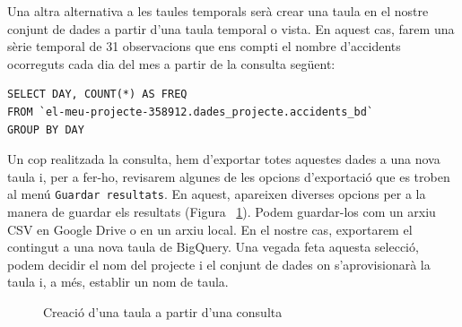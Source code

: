 \documentclass[12pt,longbibliography]{article}
\theoremstyle{definition}
\theoremstyle{remark}
\begin{document}
Una altra alternativa a les taules temporals serà crear una taula en el nostre conjunt de dades a partir d'una taula temporal o vista. En aquest cas, farem una sèrie temporal de 31 observacions que ens compti el nombre d'accidents ocorreguts cada dia del mes a partir de la consulta següent:

\begin{verbatim}
SELECT DAY, COUNT(*) AS FREQ
FROM `el-meu-projecte-358912.dades_projecte.accidents_bd`
GROUP BY DAY
\end{verbatim}

Un cop realitzada la consulta, hem d'exportar totes aquestes dades a una nova taula i, per a fer-ho, revisarem algunes de les opcions d'exportació que es troben al menú \verb|Guardar resultats|. En aquest, apareixen diverses opcions per a la manera de guardar els resultats (Figura ~\ref{fig:bq17}). Podem guardar-los com un arxiu CSV en Google Drive o en un arxiu local. En el nostre cas, exportarem el contingut a una nova taula de BigQuery. Una vegada feta aquesta selecció, podem decidir el nom del projecte i el conjunt de dades on s'aprovisionarà la taula i, a més, establir un nom de taula. 

\vspace{2mm}
\begin{figure}[h!]
\par
{}%
\hfill
{}%
\par

\caption{Creació d'una taula a partir d'una consulta}
\label{fig:bq17}
\end{figure}
\vspace{2mm}
\end{document}
